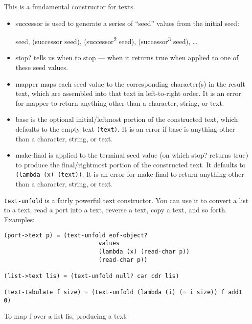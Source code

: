 \begin{entry}{%
  }

  This is a fundamental constructor
  for texts.

\begin{itemize}
  \tightlist
\item successor is used to generate a series of ``seed'' values from
  the initial seed:

  seed, (successor seed), (successor\textsuperscript{2} seed),
  (successor\textsuperscript{3} seed), \ldots{}
\item stop? tells us when to stop --- when it returns true when
  applied to one of these seed values.
\item mapper maps each seed value to the corresponding character(s) in
  the result text, which are assembled into that text in left-to-right
  order. It is an error for mapper to return anything other than a
  character, string, or text.
\item base is the optional initial/leftmost portion of the constructed
  text, which defaults to the empty text \texttt{(text)}. It is an
  error if base is anything other than a character, string, or text.
\item make-final is applied to the terminal seed value (on which stop?
  returns true) to produce the final/rightmost portion of the
  constructed text. It defaults to \texttt{(lambda\ (x)\ (text))}. It
  is an error for make-final to return anything other than a
  character, string, or text.
\end{itemize}

\texttt{text-unfold} is a fairly powerful text constructor. You can
use it to convert a list to a text, read a port into a text, reverse a
text, copy a text, and so forth. Examples:

\begin{verbatim}
(port->text p) = (text-unfold eof-object?
                           values
                           (lambda (x) (read-char p))
                           (read-char p))

(list->text lis) = (text-unfold null? car cdr lis)

(text-tabulate f size) = (text-unfold (lambda (i) (= i size)) f add1 0)
\end{verbatim}

To map f over a list lis, producing a text:


\end{entry}
